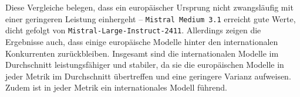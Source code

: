 Diese Vergleiche belegen, dass ein europäischer Ursprung nicht zwangsläufig mit einer geringeren Leistung einhergeht – \texttt{Mistral Medium 3.1} erreicht gute Werte, dicht gefolgt von \texttt{Mistral-Large-Instruct-2411}. Allerdings zeigen die Ergebnisse auch, dass einige europäische Modelle hinter den internationalen Konkurrenten zurückbleiben. Insgesamt sind die internationalen Modelle im Durchschnitt leistungsfähiger und stabiler, da sie die europäischen Modelle in jeder Metrik im Durchschnitt übertreffen und eine geringere Varianz aufweisen. Zudem ist in jeder Metrik ein internationales Modell führend.